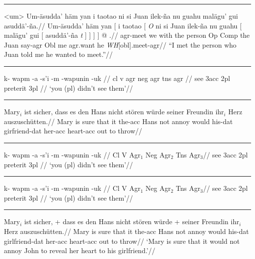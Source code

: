 \documentclass[12pt]{article}
\begin{document}
\filbreak\hrule\medskip

\begingroup
\ex<um>
\begingl
\glpreamble Um-\"asudda' h\"am yan i taotao ni si Juan
ilek-\~na nu guahu mal\"agu' gui
asudd\"a'-\~na.//
\gla Um-\"asudda' h\"am yan [ i taotao [ {\it O\/} ni si Juan
ilek-\~na nu guahu [ mal\"agu' gui [ asudd\"a'-\~na {\it
t\/} ] ] ] ] @ .//
\glb agr-meet we with the person Op Comp the Juan say-agr Obl me
agr.want he {\it WH\/}[obl].meet-agr//
\glft ``I met the person who Juan told me he wanted to
meet.''//
\endgl
\xe
\endgroup
\bigskip

\filbreak\hrule\medskip

\begingroup
\ex
\begingl[glspace=2em]
\gla[everygla=] k- wapm -a -s'i -m -wapunin -uk //
\glb[everyglb=\sc,aboveglbskip=-.4ex]
   cl v agr neg agr tns agr //
 see {\sc 3acc} {} {\sc 2pl} preterit {\sc 3pl} //
\glft[everyglft=\it,aboveglftskip=0pt] `you (pl) didn't see them'//
\endgl
\xe
\endgroup
\bigskip

\filbreak\hrule\medskip

\begingroup
\ex[exno={(6), p. 14},exnoformat={[X]}]
\begingl
\gla Mary$_i$ ist sicher, dass es den Hans nicht st\"oren w\"urde
seiner Freundin ihr$_i$ Herz auszusch\"utten.//
\glb Mary is sure that it the-{\sc acc} Hans not annoy would
his-{\sc dat} girfriend-{\sc dat} her-{\sc acc} heart-{\sc acc} {out to
throw}//
\endgl
\xe
\endgroup
\bigskip

\filbreak\hrule\medskip

\begingroup
\ex
\begingl
\gla \rightcomment{[Potawatami]}k- wapm -a -s'i -m -wapunin -uk //
\glb {}Cl V Agr$_1$ Neg Agr$_2$ Tns Agr$_3$//
 see {\sc 3acc} {} {\sc 2pl} preterit {\sc 3pl} //
\glft `you (pl) didn't see them'//
\endgl
\xe
\endgroup
\bigskip

\filbreak\hrule\medskip

\begingroup
\hsize=3.5in
\ex
\rightcomment{[Potawatami]}
\begingl
\gla k- wapm -a -s'i -m -wapunin -uk //
\glb {}Cl V Agr$_1$ Neg Agr$_2$ Tns Agr$_3$//
 see {\sc 3acc} {} {\sc 2pl} preterit {\sc 3pl} //
\glft `you (pl) didn't see them'//
\endgl
\xe
\endgroup
\bigskip

\filbreak\hrule\medskip

\begingroup
\ex
\begingl
\gla Mary$_i$ ist sicher, + dass es den Hans nicht st\"oren w\"urde
+ seiner Freundin ihr$_i$ Herz auszusch\"utten.//
\glb Mary is sure that it the-{\sc acc} Hans not annoy would
his-{\sc dat} girlfriend-{\sc dat} her-{\sc acc} heart-{\sc acc} {out to
throw}//
\glft  `Mary is sure that it would not annoy John to reveal her
heart to his girlfriend.'//
\endgl
\xe
\endgroup
\bigskip
\end{document}
